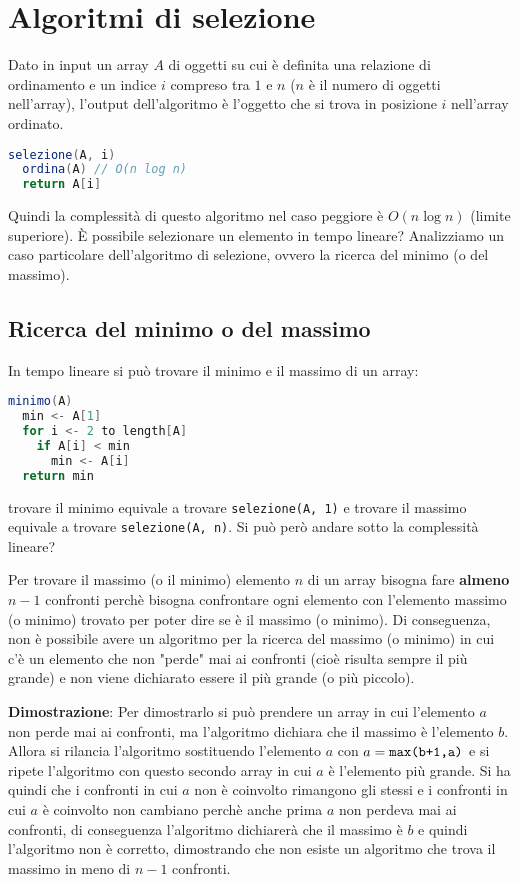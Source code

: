 \documentclass[a4paper]{article}
\begin{document}
\section{Algoritmi di selezione}
Dato in input un array \( A \) di oggetti su cui è definita una relazione di ordinamento
e un indice \( i \) compreso tra \( 1 \) e \( n \) (\( n \) è il numero di oggetti
nell'array), l'output dell'algoritmo è l'oggetto che si trova in posizione \( i \)
nell'array ordinato.
\begin{lstlisting}[language=Scala]
selezione(A, i)
  ordina(A) // O(n log n)
  return A[i]
\end{lstlisting}
Quindi la complessità di questo algoritmo nel caso peggiore è \( O(n \log n) \)
(limite superiore). È possibile selezionare un elemento in tempo lineare? Analizziamo
un caso particolare dell'algoritmo di selezione, ovvero la ricerca del minimo (o del massimo).


\subsection{Ricerca del minimo o del massimo}
\vspace{1em}
\noindent
In tempo lineare si può trovare il minimo e il massimo
di un array:
\begin{lstlisting}[language=Scala]
minimo(A)
  min <- A[1]
  for i <- 2 to length[A]
    if A[i] < min
      min <- A[i]
  return min
\end{lstlisting}
trovare il minimo equivale a trovare \texttt{selezione(A, 1)} e trovare il massimo
equivale a trovare \texttt{selezione(A, n)}. Si può però andare sotto la complessità
lineare?

\vspace{1em}
\noindent
Per trovare il massimo (o il minimo) elemento \( n \) di un array bisogna fare
\textbf{almeno} \( n-1 \) confronti perchè bisogna confrontare ogni elemento con
l'elemento massimo (o minimo) trovato per poter dire se è il massimo (o minimo).
Di conseguenza, non è possibile avere un algoritmo per la ricerca del massimo (o minimo)
in cui c'è un elemento che non "perde" mai ai confronti (cioè risulta sempre il più 
grande) e non viene dichiarato essere il più grande (o più piccolo).

\vspace{1em}
\noindent
\textbf{Dimostrazione}:
Per dimostrarlo si può prendere un array in cui l'elemento \( a \) non perde mai ai
confronti, ma l'algoritmo dichiara che il massimo è l'elemento \( b \). Allora si rilancia
l'algoritmo sostituendo l'elemento \( a \) con \( a = \text{\texttt{max(b+1,a)}} \) e si
ripete l'algoritmo con questo secondo array in cui \( a \) è l'elemento più grande. Si ha
quindi che i confronti in cui \( a \) non è coinvolto rimangono gli stessi e i confronti
in cui \( a \) è coinvolto non cambiano perchè anche prima \( a \) non perdeva mai ai
confronti, di conseguenza l'algoritmo dichiarerà che il massimo è \( b \) e quindi
l'algoritmo non è corretto, dimostrando che non esiste un algoritmo che trova il massimo
in meno di \( n-1 \) confronti.
\end{document}

